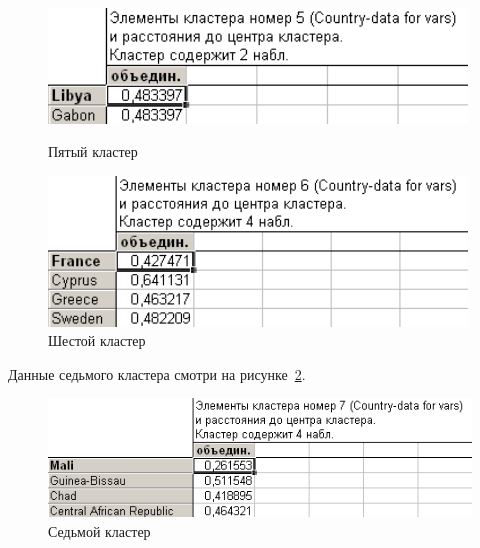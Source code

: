 \begin{figure}[!h]
  \centering
  \begin{minipage}{0.49\textwidth}
    \centering

    \includegraphics[width=0.99\textwidth]
    {inc/cars_my/var5__2_9.PNG}

    \caption{Пятый кластер}
    \label{fig:var5__2_9}
  \end{minipage}
  \begin{minipage}{0.49\textwidth}
    \centering

    \includegraphics[width=0.99\textwidth]
    {inc/cars_my/var5__2_10.PNG}

    \caption{Шестой кластер}
    \label{fig:var5__2_10}
  \end{minipage}
\end{figure}

Данные седьмого кластера смотри на рисунке~\ref{fig:var5__2_11}.

\begin{figure}[!h]
  \centering

  \includegraphics[width=16cm]
  {inc/cars_my/var5__2_11.PNG}

  \caption{Седьмой кластер}
  \label{fig:var5__2_11}
\end{figure}

